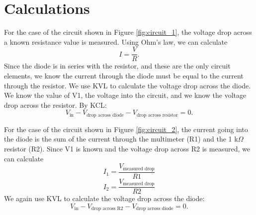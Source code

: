 \documentclass[12pt,letterpaper]{report}
\begin{document}
\section*{Calculations}

For the case of the circuit shown in Figure \ref{fig:circuit_1}, the voltage drop across a known resistance value is measured. Using Ohm's law, we can calculate
$$
I = \frac{V}{R}.
$$
Since the diode is in series with the resistor, and these are the only circuit elements, we know the current through the diode must be equal to the current through the resistor. 
We use KVL to calculate the voltage drop across the diode. We know the value of V1, the voltage into the circuit, and we know the voltage drop across the resistor. By KCL:
$$
V_{\text{in}} - V_{\text{drop across diode}} - V_{\text{drop across resistor}} = 0.
$$

For the case of the circuit shown in Figure \ref{fig:circuit_2}, the current going into the diode is the sum of the current through the multimeter (R1) and the 1 k$\Omega$ resistor (R2). Since V1 is known and the voltage drop across R2 is measured, we can calculate
$$
I_1 = \frac{V_{\text{measured drop}}}{R1}
$$
$$
I_2 = \frac{V_{\text{measured drop}}}{R2}
$$
We again use KVL to calculate the voltage drop across the diode:
$$
V_{\text{in}} - V_{\text{drop across R2}} - V_{\text{drop across diode}} = 0.
$$
\end{document}
